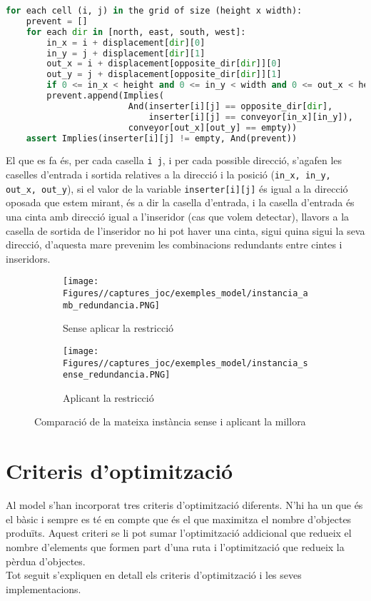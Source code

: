 \begin{lstlisting}[language=Python, caption=Evitar inserdiors redundants]
for each cell (i, j) in the grid of size (height x width):
    prevent = []
    for each dir in [north, east, south, west]:
        in_x = i + displacement[dir][0]
        in_y = j + displacement[dir][1]
        out_x = i + displacement[opposite_dir[dir]][0]
        out_y = j + displacement[opposite_dir[dir]][1]
        if 0 <= in_x < height and 0 <= in_y < width and 0 <= out_x < height and 0 <= out_y < width:
        prevent.append(Implies(
                        And(inserter[i][j] == opposite_dir[dir],
                            inserter[i][j] == conveyor[in_x][in_y]),
                        conveyor[out_x][out_y] == empty))
    assert Implies(inserter[i][j] != empty, And(prevent))
\end{lstlisting}

El que es fa és, per cada casella \texttt{i j}, i per cada possible direcció, s'agafen les caselles d'entrada i sortida relatives a la direcció i la posició (\texttt{in\_x, in\_y, out\_x, out\_y}), si el valor de la variable \texttt{inserter[i][j]} és igual a la direcció oposada que estem mirant, és a dir la casella d'entrada, i la casella d'entrada és una cinta amb direcció igual a l'inseridor (cas que volem detectar), llavors a la casella de sortida de l'inseridor no hi pot haver una cinta, sigui quina sigui la seva direcció, d'aquesta mare prevenim les combinacions redundants entre cintes i inseridors.

\begin{figure}[H]
    \centering
    \begin{subfigure}{0.45\textwidth}
        \texttt{[image: Figures//captures\_joc/exemples\_model/instancia\_amb\_redundancia.PNG]}
        \caption{Sense aplicar la restricció}
    \end{subfigure}
    \hfill
    \begin{subfigure}{0.45\textwidth}
        \texttt{[image: Figures//captures\_joc/exemples\_model/instancia\_sense\_redundancia.PNG]}
        \caption{Aplicant la restricció}
    \end{subfigure}
    \caption{Comparació de la mateixa instància sense i aplicant la millora}
\end{figure}

\section{Criteris d'optimització}
Al model s'han incorporat tres criteris d'optimització diferents. N'hi ha un que és el bàsic i sempre es té en compte que és el que maximitza el nombre d'objectes produïts. Aquest criteri se li pot sumar l'optimització addicional que redueix el nombre d'elements que formen part d'una ruta i l'optimització que redueix la pèrdua d'objectes.\\
Tot seguit s'expliquen en detall els criteris d'optimització i les seves implementacions.

